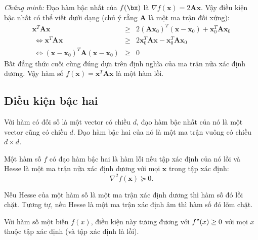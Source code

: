 \textit{Chứng minh:} Đạo hàm bậc nhất của $f(\bx)$ là 
\begin{math} 
\nabla f(\mathbf{x}) = 2\mathbf{A} \mathbf{x} 
\end{math}.
Vậy điều kiện bậc nhất có thể viết dưới dạng (chú ý rằng $\mathbf{A}$ là một ma trận đối xứng): 
\begin{eqnarray*} 
\mathbf{x}^T\mathbf{Ax} &\geq& 2(\mathbf{A}\mathbf{x}_0)^T (\mathbf{x} - \mathbf{x}_0) + \mathbf{x}_0^T\mathbf{A}\mathbf{x}_0 \\\ 
\Leftrightarrow \mathbf{x}^T\mathbf{Ax} &\geq& 2\mathbf{x}_0^T\mathbf{A}\mathbf{x} -\mathbf{x}_0^T\mathbf{A}\mathbf{x}_0  \\\ 
\Leftrightarrow (\mathbf{x} - \mathbf{x}_0)^T\mathbf{A}(\mathbf{x} - \mathbf{x}_0) &\geq& 0 
\end{eqnarray*} 
Bất đẳng thức cuối cùng đúng dựa trên định nghĩa của ma trận {nửa xác
định dương}. Vậy hàm số $f(\mathbf{x}) = \mathbf{x}^T\mathbf{A}\mathbf{x}$ là
một {hàm lồi}. \dpcm
 

\subsection{Điều kiện bậc hai}
\index{Hesse -- Hessian}
Với hàm có đối số là một vector có chiều $d$, đạo hàm bậc
nhất của nó là một vector cũng có chiều $d$. Đạo hàm bậc hai của nó là một ma
trận vuông có chiều $d\times d$.

 {Một hàm số $f$ có đạo hàm bậc hai là hàm lỗi nếu tập xác định của nó lồi và Hesse là một ma trận {nửa xác định dương} với mọi $\mathbf{x}$ trong tập xác định: 
\begin{equation*} 
\nabla^2 f(\mathbf{x}) \succeq 0. 
\end{equation*} 
}


Nếu Hesse của một hàm số là một ma trận {xác định dương} thì hàm số đó
lồi chặt. Tương tự, nếu Hesse là một ma trận {xác
định âm} thì hàm số đó lõm chặt.
 
Với hàm số một biến $f(x)$, điều kiện này tương đương với $f"(x) \geq 0$ với mọi
$x$ thuộc tập xác định (và tập xác định là lồi).
 
